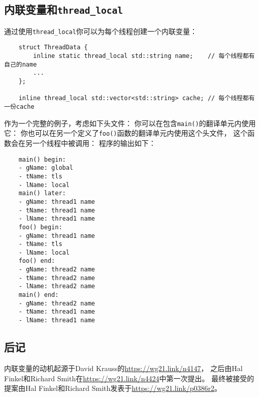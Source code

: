 \subsection{内联变量和\texttt{thread\_local}}
通过使用\texttt{thread\_local}你可以为每个线程创建一个内联变量：
\begin{lstlisting}
    struct ThreadData {
        inline static thread_local std::string name;    // 每个线程都有自己的name
        ...
    };

    inline thread_local std::vector<std::string> cache; // 每个线程都有一份cache
\end{lstlisting}
作为一个完整的例子，考虑如下头文件：
你可以在包含\texttt{main()}的翻译单元内使用它：
你也可以在另一个定义了\texttt{foo()}函数的翻译单元内使用这个头文件，
这个函数会在另一个线程中被调用：
程序的输出如下：
\begin{lstlisting}
    main() begin:
    - gName: global
    - tName: tls
    - lName: local
    main() later:
    - gName: thread1 name
    - tName: thread1 name
    - lName: thread1 name
    foo() begin:
    - gName: thread1 name
    - tName: tls
    - lName: local
    foo() end:
    - gName: thread2 name
    - tName: thread2 name
    - lName: thread2 name
    main() end:
    - gName: thread2 name
    - tName: thread1 name
    - lName: thread1 name
\end{lstlisting}

\subsection{后记}
内联变量的动机起源于David Krauss的\url{https://wg21.link/n4147}，
之后由Hal Finkel和Richard Smith在\url{https://wg21.link/n4424}中第一次提出。
最终被接受的提案由Hal Finkel和Richard Smith发表于\url{https://wg21.link/p0386r2}。